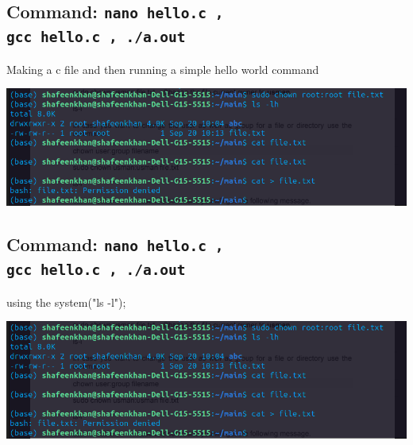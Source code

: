 \documentclass[a4paper,12pt]{article}
\begin{document}
\subsection{Command: \texttt{nano hello.c ,\\ gcc hello.c , ./a.out}}
Making a c file and then running a simple hello world command
\begin{center}
    \includegraphics[width=\linewidth]{Screenshot from 2024-09-20 10-15-27.png}
\end{center}

\subsection{Command: \texttt{nano hello.c ,\\ gcc hello.c , ./a.out}}
using the system("ls -l");
\begin{center}
    \includegraphics[width=\linewidth]{Screenshot from 2024-09-20 10-15-27.png}
\end{center}
\end{document}
